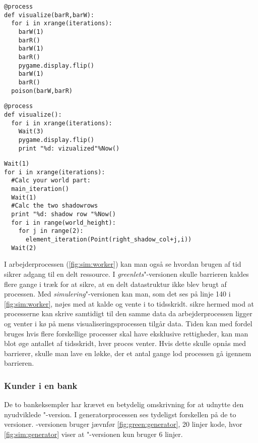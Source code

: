 \begin{lstlisting}[firstnumber=157 ,float=hbtp, label=fig:green:visualize, caption=\code{Greenlets}"-versionen af visualize]
@process
def visualize(barR,barW):
  for i in xrange(iterations):
    barW(1)
    barR()
    barW(1)
    barR()
    pygame.display.flip()
    barW(1)
    barR()
  poison(barW,barR)     
\end{lstlisting}
\begin{lstlisting}[firstnumber=144 ,float=hbtp, label=fig:sim:visualize, caption=\code{simulerings}"-versionen af visualize]
@process
def visualize():
  for i in xrange(iterations):
    Wait(3)  
    pygame.display.flip()
    print "%d: vizualized"%Now()
\end{lstlisting}
\begin{lstlisting}[firstnumber=130 ,float=hbtp, label=fig:sim:worker, caption=Uddrag af arbejderprocessen i simulering]
Wait(1)
for i in xrange(iterations):
  #Calc your world part:
  main_iteration()
  Wait(1)
  #Calc the two shadowrows
  print "%d: shadow row "%Now()
  for i in range(world_height):
    for j in range(2):
      element_iteration(Point(right_shadow_col+j,i))
  Wait(2)
\end{lstlisting}
I arbejderprocessen (\cref{fig:sim:worker}) kan man også se hvordan brugen af tid  sikrer adgang til en delt ressource. I  \emph{greenlets}"-versionen skulle barrieren  kaldes flere gange i træk for at sikre, at en delt datastruktur ikke blev brugt af processen. Med \emph{simulering}"-versionen kan man, som det ses på linje 140 i \cref{fig:sim:worker}, nøjes med at kalde  og vente i to tidsskridt. 
 sikre hermed mod at processerne kan skrive samtidigt til den samme data da arbejderprocessen ligger og venter i kø på  mens visualiseringsprocessen tilgår data. Tiden kan med fordel bruges hvis flere forskellige processer skal have eksklusive rettigheder, kan man blot øge antallet af tidsskridt, hver proces venter. Hvis dette skulle opnås med barrierer, skulle man lave en løkke, der et antal gange lod processen gå igennem barrieren.

\subsubsection{Kunder i en bank}
De to bankeksempler har krævet en betydelig omskrivning for at udnytte den nyudviklede "-version. I generatorprocessen ses tydeligst forskellen på de to versioner. -versionen bruger jævnfør \cref{fig:green:generator}, 20 linjer kode, hvor \cref{fig:sim:generator} viser at "-versionen kun bruger 6 linjer. 

